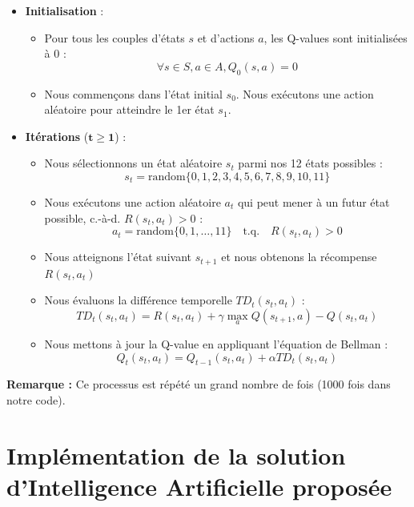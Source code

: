 \documentclass{article}
\begin{document}
\begin{itemize}
    \item \textbf{Initialisation} :
    \begin{itemize}
        \item Pour tous les couples d'états $s$ et d'actions $a$, les Q-values sont initialisées à $0$ :
        \[
        \forall s \in S, a \in A, Q_0(s, a) = 0
        \]
        \item Nous commençons dans l'état initial $s_0$. Nous exécutons une action aléatoire pour atteindre le 1er état $s_1$.
    \end{itemize}
    
    \item \textbf{Itérations} ($\mathbf{t \geq 1}$) :
    \begin{itemize}
        \item Nous sélectionnons un état aléatoire $s_t$ parmi nos 12 états possibles :
        \[
        s_t = \text{random}\{0, 1, 2, 3, 4, 5, 6, 7, 8, 9, 10, 11\}
        \]
        
        \item Nous exécutons une action aléatoire $a_t$ qui peut mener à un futur état possible, c.-à-d. $R(s_t, a_t) > 0$ :
        \[
        a_t = \text{random}\{0, 1, \dots, 11\} \quad \text{t.q.} \quad R(s_t, a_t) > 0
        \]
        
        \item Nous atteignons l'état suivant $s_{t+1}$ et nous obtenons la récompense $R(s_t, a_t)$
        
        \item Nous évaluons la différence temporelle $TD_t(s_t, a_t)$ :
        \[
        TD_t(s_t, a_t) = R(s_t, a_t) + \gamma \max_a Q(s_{t+1}, a) - Q(s_t, a_t)
        \]
        
        \item Nous mettons à jour la Q-value en appliquant l'équation de Bellman :
        \[
        Q_t(s_t, a_t) = Q_{t-1}(s_t, a_t) + \alpha TD_t(s_t, a_t)
        \]
    \end{itemize}
\end{itemize}

\textbf{Remarque :} Ce processus est répété un grand nombre de fois (1000 fois dans notre code).

\section{Implémentation de la solution d'Intelligence Artificielle proposée}
\end{document}
